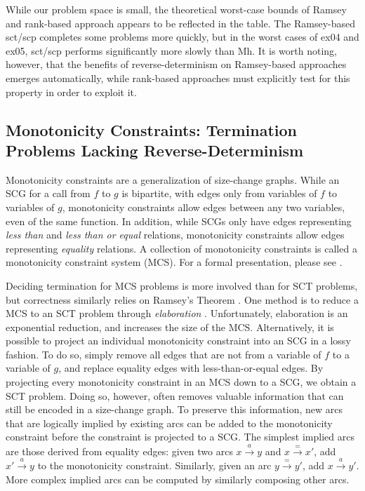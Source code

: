 \documentclass{LMCS}
\newcommand\vararrow[1]{\stackrel{#1}{\rightarrow}}
\begin{document}
While our problem space is small, the theoretical worst-case bounds of
Ramsey and rank-based approach appears to be reflected in the table. The
Ramsey-based sct/scp completes some problems more quickly, but in the worst
cases of ex04 and ex05, sct/scp performs significantly more slowly than Mh. It
is worth noting, however, that the benefits of reverse-determinism on
Ramsey-based approaches emerges automatically, while rank-based approaches must
explicitly test for this property in order to exploit it. 

\subsection{Monotonicity Constraints: Termination Problems Lacking
  Reverse-Deter\-minism}

Monotonicity constraints \cite{CLS05} are a generalization of size-change
graphs. While an SCG for a call from $f$ to $g$ is bipartite, with edges
only from variables of $f$ to variables of $g$, monotonicity constraints allow
edges between any two variables, even of the same function. In addition, while SCGs
only have edges representing \emph{less than} and \emph{less than or equal}
relations, monotonicity constraints allow edges representing \emph{equality}
relations. A collection of monotonicity constraints is called a monotonicity
constraint system (MCS). For a formal presentation, please see \cite{BenAm10}.

Deciding termination for MCS problems is more involved than for SCT problems,
but correctness similarly relies on Ramsey's Theorem \cite{CLS05}. One method
is to reduce a MCS to an SCT problem through {\em elaboration} \cite{BenAm10}. Unfortunately,
elaboration is an exponential reduction, and increases the size of the MCS.
Alternatively, it is possible to project an individual monotonicity constraint into an SCG in a
lossy fashion. To do so, simply remove all edges that are not from a variable of $f$ to a variable
of $g$, and replace equality edges with less-than-or-equal edges. By projecting every monotonicity
constraint in an MCS down to a SCG, we obtain a SCT problem.  Doing so, however, often removes
valuable information that can still be encoded in a size-change graph. To preserve this information,
new arcs that are logically implied by existing arcs can be added to the monotonicity constraint
before the constraint is projected to a SCG.  The simplest implied arcs are those derived from
equality edges: given two arcs $x \vararrow{a} y$ and $x \vararrow{=} x'$, add $x' \vararrow{a} y$
to the monotonicity constraint. Similarly, given an arc $y \vararrow{=} y'$, add $x \vararrow{a}
y'$. More complex implied arcs can be computed by similarly composing other arcs.
\end{document}
